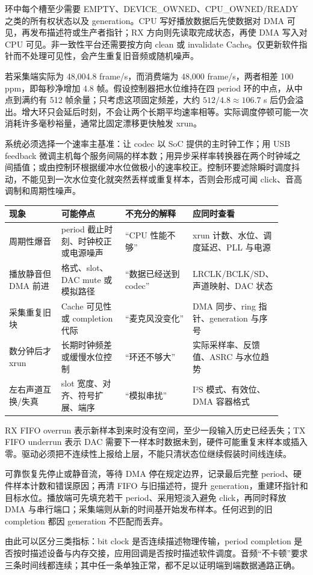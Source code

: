环中每个槽至少需要 EMPTY、DEVICE\_OWNED、CPU\_OWNED/READY 之类的所有权状态以及 generation。CPU 写好播放数据后先使数据对 DMA 可见，再发布描述符或生产者指针；RX 方向则先读取完成状态，再使 DMA 写入对 CPU 可见。非一致性平台还需要按方向 clean 或 invalidate Cache。仅更新软件指针而不处理可见性，会产生重复旧音频或随机噪声。


若采集端实际为 48,004.8 frame/s，而消费端为 48,000 frame/s，两者相差 100 ppm，即每秒净增加 4.8 帧。假设控制器把水位维持在四 period 环的中点，从中点到满约有 512 帧余量；只考虑这项固定频差，大约 $512/4.8\approx106.7$ s 后仍会溢出。增大环只会延后时刻，不会让两个长期平均速率相等。实际调度停顿可能一次消耗许多毫秒裕量，通常比固定漂移更快触发 xrun。

系统必须选择一个速率主基准：让 codec 以 SoC 提供的主时钟工作；用 USB feedback 微调主机每个服务间隔的样本数；用异步采样率转换器在两个时钟域之间插值；或由控制环根据缓冲水位做极小的速率校正。控制环要滤除瞬时调度抖动，不能见到一次水位变化就突然丢样或重复样本，否则会形成可闻 click、音高调制和周期性噪声。

\begin{longtable}{L{0.2\linewidth}L{0.24\linewidth}L{0.26\linewidth}L{0.2\linewidth}}
\toprule
现象 & 可能停点 & 不充分的解释 & 应同时查看 \\
\midrule
周期性爆音 & period 截止时刻、时钟校正或电源噪声 & “CPU 性能不够” & xrun 计数、水位、调度延迟、PLL 与电源 \\\tablerowrule
播放静音但 DMA 前进 & 格式、slot、DAC mute 或模拟路径 & “数据已经送到 codec” & LRCLK/BCLK/SD、声道映射、DAC 状态 \\\tablerowrule
采集重复旧块 & Cache 可见性或 completion 代际 & “麦克风没变化” & DMA 同步、ring 指针、generation 与序号 \\\tablerowrule
数分钟后才 xrun & 长期时钟频差或缓慢水位控制 & “环还不够大” & 实际采样率、反馈值、ASRC 与水位趋势 \\\tablerowrule
左右声道互换/失真 & slot 宽度、对齐、符号扩展、端序 & “模拟串扰” & I²S 模式、有效位、DMA 容器格式 \\
\bottomrule
\end{longtable}


RX FIFO overrun 表示新样本到来时没有空间，至少一段输入历史已经丢失；TX FIFO underrun 表示 DAC 需要下一样本时数据未到，硬件可能重复末样本或插入零。驱动必须把不连续性上报给上层，不能只清状态位继续假装时间线连续。

可靠恢复先停止或静音流，等待 DMA 停在规定边界，记录最后完整 period、硬件样本计数和错误原因；再清 FIFO 与旧描述符，提升 generation，重建环指针和目标水位。播放端可先填充若干 period、采用短淡入避免 click，再同时释放 DMA 与串行端口；采集端则从新的时间基开始发布样本。任何迟到的旧 completion 都因 generation 不匹配而丢弃。

由此可以区分三类指标：bit clock 是否连续描述物理传输，period completion 是否按时描述设备与内存交接，应用回调是否按时描述软件调度。音频“不卡顿”要求三条时间线都连续；其中任一条单独正常，都不足以证明端到端数据通路正确。

